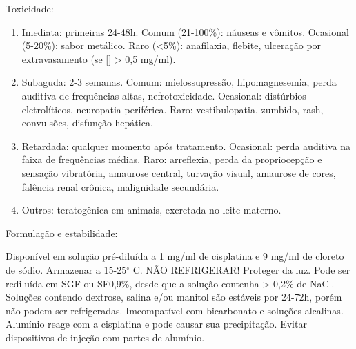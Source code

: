 \documentclass[graybox]{svmult}
\begin{document}
Toxicidade:
\renewcommand{\labelenumi}{\Alph{enumi}}
\begin{enumerate}
	\item Imediata: primeiras 24-48h. Comum (21-100\%): náuseas e vômitos. Ocasional (5-20\%): sabor metálico. Raro (<5\%): anafilaxia, flebite, ulceração por extravasamento (se [] > 0,5 mg/ml).
	\item Subaguda: 2-3 semanas. Comum: mielossupressão, hipomagnesemia, perda auditiva de frequências altas, nefrotoxicidade. Ocasional: distúrbios eletrolíticos, neuropatia periférica. Raro: vestibulopatia, zumbido, rash, convulsões, disfunção hepática.
	\item Retardada: qualquer momento após tratamento. Ocasional: perda auditiva na faixa de frequências médias. Raro: arreflexia, perda da propriocepção e sensação vibratória, amaurose central, turvação visual, amaurose de cores, falência renal crônica, malignidade secundária.
	\item Outros: teratogênica em animais, excretada no leite materno.
\end{enumerate}

Formulação e estabilidade:

	Disponível em solução pré-diluída a 1 mg/ml de cisplatina e 9 mg/ml de cloreto de sódio. Armazenar a 15-25\(^\circ\) C. NÃO REFRIGERAR! Proteger da luz. Pode ser rediluída em SGF ou SF0,9\%, desde que a solução contenha > 0,2\% de NaCl. Soluções contendo dextrose, salina e/ou manitol são estáveis por 24-72h, porém não podem ser refrigeradas. Imcompatível com bicarbonato e soluções alcalinas. Alumínio reage com a cisplatina e pode causar sua precipitação. Evitar dispositivos de injeção com partes de alumínio. 



\end{document}
